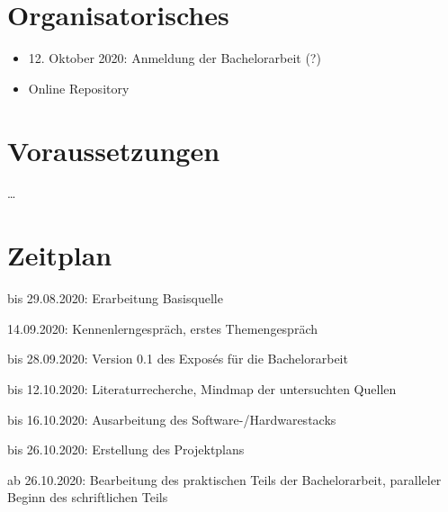 \documentclass[11pt]{article}
\newcommand{\cmark}{\ding{51}}%
\newcommand{\done}{\rlap{$\square$}{\raisebox{2pt}{\large\hspace{1pt}\cmark}}%
\hspace{-2.5pt}}
\begin{document}
    \section{Organisatorisches}
    \begin{itemize}
        \item 12. Oktober 2020: Anmeldung der Bachelorarbeit (?)
        \item Online Repository~\cite{github}
    \end{itemize}

    \section{Voraussetzungen}
    \ldots

    \newpage

    \section{Zeitplan}
    \begin{todolist}
        \item[\done] bis 29.08.2020: Erarbeitung Basisquelle
        \item[\done] 14.09.2020: Kennenlerngespräch, erstes Themengespräch
        \item bis 28.09.2020: Version 0.1 des Exposés für die Bachelorarbeit
        \item bis 12.10.2020: Literaturrecherche, Mindmap der untersuchten Quellen
        \item bis 16.10.2020: Ausarbeitung des Software-/Hardwarestacks
        \item bis 26.10.2020: Erstellung des Projektplans
        \item ab 26.10.2020: Bearbeitung des praktischen Teils der Bachelorarbeit, paralleler Beginn des
        schriftlichen Teils
    \end{todolist}

    ~\nocite{*}
    
    
\end{document}
